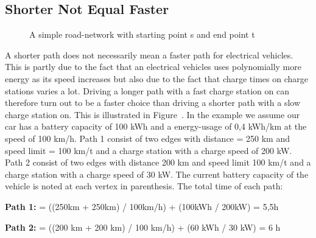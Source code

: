 \subsection{Shorter Not Equal Faster}

\begin{figure}

\label{figure:simpleroad-network}
\caption{A simple road-network with starting point s and end point t}
\end{figure}
A shorter path does not necessarily mean a faster path for electrical vehicles. 
This is partly due to the fact that an electrical vehicles uses polynomially more energy as its speed increases but also due to the fact that charge times on charge stations varies a lot. 
Driving a longer path with a fast charge station on can therefore turn out to be a faster choice than driving a shorter path with a slow charge station on. 
This is illustrated in Figure~. In the example we assume our car has a battery capacity of 100 kWh and a energy-usage of 0,4 kWh/km at the speed of 100 km/h. Path 1 consist of two edges with distance = 250 km and speed limit = 100 km/t
and a charge station with a charge speed of 200 kW. Path 2 consist of two edges with
distance 200 km and speed limit 100 km/t and a charge station with a charge speed of 30 kW. The current battery capacity of the vehicle is noted at each vertex in parenthesis. The total time of each path:
				
\textbf{Path 1:}  = ((250km + 250km) / 100km/h) + (100kWh / 200kW) = 5,5h
				
\textbf{Path 2:}  = ((200 km + 200 km) / 100 km/h) + (60 kWh / 30 kW) = 6 h